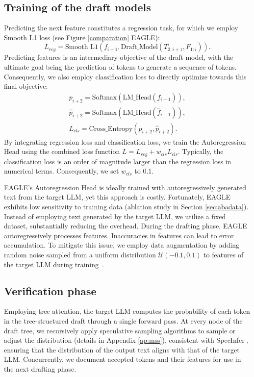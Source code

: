 \documentclass{article}
\theoremstyle{plain}
\theoremstyle{definition}
\theoremstyle{remark}
\begin{document}
\subsection{Training of the draft models}

Predicting the next feature constitutes a regression task, for which we employ Smooth L1 loss (see Figure \ref{comparation} EAGLE):
\begin{equation*}
    L_{reg} = \text{Smooth L1}(f_{i+1}, \text{Draft\_Model}(T_{2:i+1}, F_{1:i})).
\end{equation*} 
Predicting features is an intermediary objective of the draft model, with the ultimate goal being the prediction of tokens to generate a sequence of tokens. Consequently, we also employ classification loss to directly optimize towards this final objective:
\begin{gather*}
    {p}_{i+2}=\text{Softmax}(\text{LM\_Head}({f}_{i+1})), \\
    \hat{p}_{i+2}=\text{Softmax}(\text{LM\_Head}(\hat{f}_{i+1})), \\
    L_{cls} = \text{Cross\_Entropy}({p}_{i+2},\hat{p}_{i+2}).
\end{gather*}
By integrating regression loss and classification loss, we train the Autoregression Head using the combined loss function $L=L_{reg}+w_{cls}L_{cls}$.
Typically, the classification loss is an order of magnitude larger than the regression loss in numerical terms. Consequently, we set $w_{cls}$ to 0.1.

EAGLE's Autoregression Head is ideally trained with autoregressively generated text from the target LLM, yet this approach is costly. Fortunately, EAGLE exhibits low sensitivity to training data (ablation study in Section \ref{sec:abadata}). Instead of employing text generated by the target LLM, we utilize a fixed dataset, substantially reducing the overhead. 
During the drafting phase, EAGLE autoregressively processes features. Inaccuracies in features can lead to error accumulation. To mitigate this issue, we employ data augmentation by adding random noise sampled from a uniform distribution $\mathcal{U}(-0.1, 0.1)$ to features of the target LLM during training~\cite{jain2023neftune}.



\subsection{Verification phase}
Employing tree attention, the target LLM computes the probability of each token in the tree-structured draft through a single forward pass. At every node of the draft tree, we recursively apply speculative sampling algorithms to sample or adjust the distribution (details in Appendix \ref{ap:mss}), consistent with SpecInfer \cite{miao2023specinfer}, ensuring that the distribution of the output text aligns with that of the target LLM. Concurrently, we document accepted tokens and their features for use in the next drafting phase.
\end{document}
